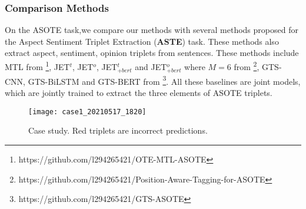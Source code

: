 \documentclass[11pt]{article}
\begin{document}
\subsubsection{Comparison Methods}
On the ASOTE task,we compare our methods with several methods proposed for the Aspect Sentiment Triplet Extraction (\textbf{ASTE}) task. These methods also extract aspect, sentiment, opinion triplets from sentences. These methods include MTL from \citet{zhang-etal-2020-multi-task}\footnote{https://github.com/l294265421/OTE-MTL-ASOTE}, JET$^t$, JET$^o$, JET$^t_{+bert}$ and JET$^o_{+bert}$  where  $M=6$ from \citet{xu-etal-2020-position}\footnote{https://github.com/l294265421/Position-Aware-Tagging-for-ASOTE}, GTS-CNN, GTS-BiLSTM and GTS-BERT from \citet{wu-etal-2020-grid}\footnote{https://github.com/l294265421/GTS-ASOTE}. All these baselines are joint models, which are jointly trained to extract the three elements of ASOTE triplets.

\begin{figure*}
	\centering
	\texttt{[image: case1\_20210517\_1820]}
	\caption{Case study. Red triplets are incorrect predictions.}
	\label{fig:case_study}
\end{figure*}
\end{document}
